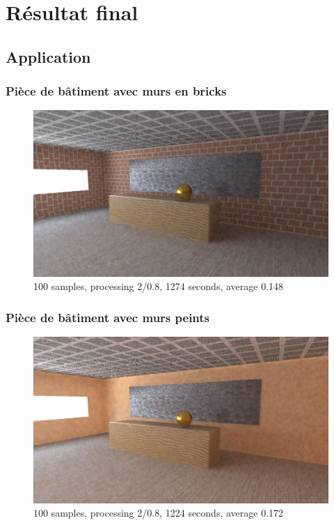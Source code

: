 \documentclass[handout]{beamer}
\begin{document}
\section{Résultat final}

\subsection{Application}

\begin{frame}
    \frametitle{Pièce de bâtiment avec murs en bricks}

    \begin{figure}
        \includegraphics[scale=0.25]{piece_bricks.png}
        \caption{100 samples, processing 2/0.8, 1274 seconds, average 0.148}
    \end{figure}

\end{frame}

\begin{frame}
    \frametitle{Pièce de bâtiment avec murs peints}

    \begin{figure}
        \includegraphics[scale=0.25]{piece_peinture.png}
        \caption{100 samples, processing 2/0.8, 1224 seconds, average 0.172}
    \end{figure}

\end{frame}
\end{document}
